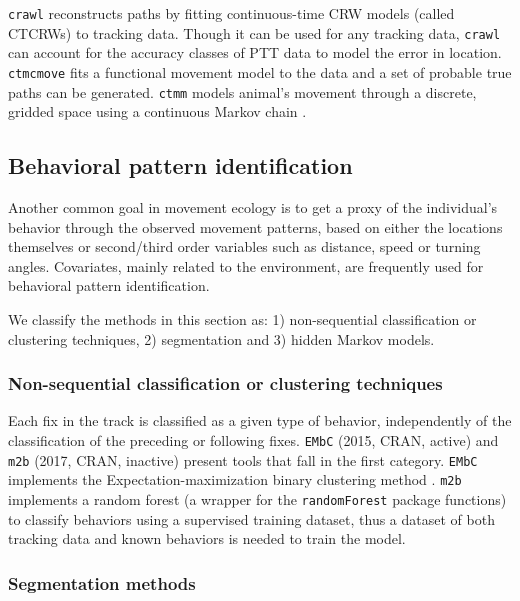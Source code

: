 \documentclass[a4paper,12pt]{article}
\newcommand{\Rpkg}[1]{\texttt{#1}}
\begin{document}
	\Rpkg{crawl} reconstructs paths by fitting continuous-time CRW models (called CTCRWs) \citep{Johnson2008} to tracking data. Though it can be used for any tracking data, \Rpkg{crawl} can account for the accuracy classes of PTT data to model the error in location. \Rpkg{ctmcmove} fits a functional movement model \citep{Buderman2016} to the data and a set of probable true paths can be generated. \Rpkg{ctmm} models animal's movement through a discrete, gridded space using a continuous Markov chain \citep{Hanks2015}. 
	
	\subsection*{Behavioral pattern identification}
	
	Another common goal in movement ecology is to get a proxy of the individual's behavior through the observed movement patterns, based on either the locations themselves or second/third order variables such as distance, speed or turning angles. Covariates, mainly related to the environment, are frequently used for behavioral pattern identification. 
	
	We classify the methods in this section as: 1) non-sequential classification or clustering techniques, 2) segmentation and 3) hidden Markov models.
	
	\subsubsection*{Non-sequential classification or clustering techniques}
	
	Each fix in the track is classified as a given type of behavior, independently of the classification of the preceding or following fixes. \Rpkg{EMbC} (2015, CRAN, active) \citep{REMbC} and \Rpkg{m2b} (2017, CRAN, inactive) \citep{Rm2b} present tools that fall in the first category. \Rpkg{EMbC} implements the Expectation-maximization binary clustering method \citep{Garriga2016}. \Rpkg{m2b} implements a random forest (a wrapper for the \Rpkg{randomForest} \citep{Liaw2002} package functions) to classify behaviors using a supervised training dataset, thus a dataset of both tracking data and known behaviors is needed to train the model.
	
	\subsubsection*{Segmentation methods}
	
\end{document}
